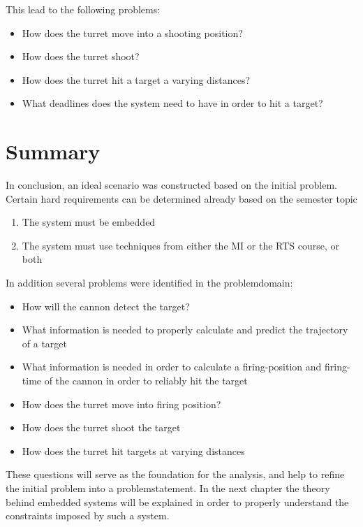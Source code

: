 This lead to the following problems:
\begin{itemize}
  \item How does the turret move into a shooting position?
  \item How does the turret shoot?
  \item How does the turret hit a target a varying distances?
  \item What deadlines does the system need to have in order to hit a target?
\end{itemize}

\section{Summary}
In conclusion, an ideal scenario was constructed based on the initial problem.
Certain hard requirements can be determined already based on the semester topic
\begin{enumerate}
	\item The system must be embedded
	\item The system must use techniques from either the MI or the RTS course, or both
\end{enumerate}


In addition several problems were identified in the problemdomain:
\begin{itemize}
	\item How will the cannon detect the target?
	\item What information is needed to properly calculate and predict the trajectory of a target
	\item What information is needed in order to calculate a firing-position and firing-time of the cannon in order to reliably hit the target
	\item How does the turret move into firing position?
	\item How does the turret shoot the target
	\item How does the turret hit targets at varying distances
\end{itemize}
These questions will serve as the foundation for the analysis, and help to refine the initial problem into a problemstatement. In the next chapter the theory behind embedded systems will be explained in order to properly understand the constraints imposed by such a system. 

